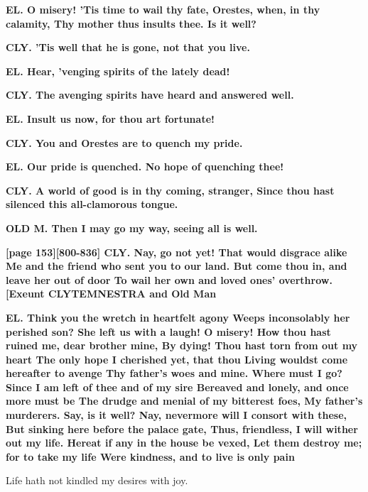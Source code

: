 \documentclass[11pt,letter]{book}
\begin{document}
\par \textbf{EL. O misery! ’Tis time to wail thy fate, Orestes, when, in thy calamity, Thy mother thus insults thee. Is it well?}
\par 

\par \textbf{CLY. ’Tis well that he is gone, not that you live.}
\par 

\par \textbf{EL. Hear, ’venging spirits of the lately dead!}
\par 

\par \textbf{CLY. The avenging spirits have heard and answered well.}
\par 

\par \textbf{EL. Insult us now, for thou art fortunate!}
\par 

\par \textbf{CLY. You and Orestes are to quench my pride.}
\par 

\par \textbf{EL. Our pride is quenched. No hope of quenching thee!}
\par 

\par \textbf{CLY. A world of good is in thy coming, stranger, Since thou hast silenced this all-clamorous tongue.}
\par 

\par \textbf{OLD M. Then I may go my way, seeing all is well.}
\par 

\par \textbf{[page 153][800-836] CLY. Nay, go not yet! That would disgrace alike Me and the friend who sent you to our land. But come thou in, and leave her out of door To wail her own and loved ones’ overthrow. [Exeunt CLYTEMNESTRA and Old Man}
\par 

\par \textbf{EL. Think you the wretch in heartfelt agony Weeps inconsolably her perished son? She left us with a laugh! O misery! How thou hast ruined me, dear brother mine, By dying! Thou hast torn from out my heart The only hope I cherished yet, that thou Living wouldst come hereafter to avenge Thy father’s woes and mine. Where must I go? Since I am left of thee and of my sire Bereaved and lonely, and once more must be The drudge and menial of my bitterest foes, My father’s murderers. Say, is it well? Nay, nevermore will I consort with these, But sinking here before the palace gate, Thus, friendless, I will wither out my life. Hereat if any in the house be vexed, Let them destroy me; for to take my life Were kindness, and to live is only pain}
\par   Life hath not kindled my desires with joy.
\end{document}
